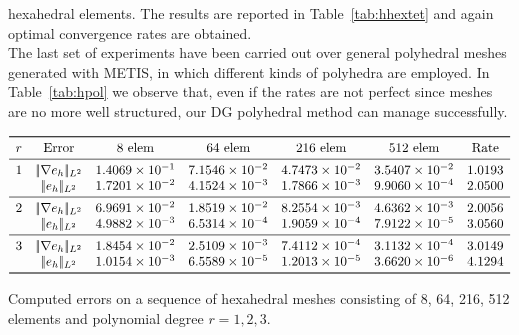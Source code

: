 \documentclass[12pt, a4paper]{article}
\theoremstyle{definition}
\theoremstyle{plain}
\theoremstyle{plain}
\theoremstyle{definition}
\begin{document}
hexahedral elements. The results are reported in Table~\ref{tab:hhextet} and 
again optimal convergence rates are obtained.\\
The last set of experiments have been carried out over general polyhedral 
meshes generated with METIS, in which different kinds of polyhedra are 
employed. In Table~\ref{tab:hpol} we observe that, even if the rates are not 
perfect since meshes are no more well structured, our DG polyhedral method can 
manage successfully.
\begin{table}[h]\footnotesize
	\centering
	\[
	\begin{array}{ccccccc}
	\toprule
	r & \text{Error} & \text{8 elem} & \text{64 elem} & \text{216 elem} & \text{512 elem} & \text{Rate} \\ 
	\midrule
	1 & |\!|\nabla e_{h}|\!|_{L^2} & 1.4069 \times 10^{-1} & 7.1546 \times 10^{-2} & 4.7473 \times 10^{-2} & 3.5407 \times 10^{-2} & 1.0193\\
	& |\!|e_{h}|\!|_{L^2} & 1.7201 \times 10^{-2} & 4.1524 \times 10^{-3} & 1.7866 \times 10^{-3} & 9.9060 \times 10^{-4} & 2.0500\\
	\midrule
	2 & |\!|\nabla e_{h}|\!|_{L^2} & 6.9691 \times 10^{-2} & 1.8519 \times 10^{-2} & 8.2554 \times 10^{-3} & 4.6362 \times 10^{-3} & 2.0056\\
	& |\!|e_{h}|\!|_{L^2} & 4.9882 \times 10^{-3} & 6.5314 \times 10^{-4} & 1.9059 \times 10^{-4} & 7.9122 \times 10^{-5} & 3.0560\\
	\midrule
	3 & |\!|\nabla e_{h}|\!|_{L^2} & 1.8454 \times 10^{-2} & 2.5109 \times 10^{-3} & 7.4112 \times 10^{-4} & 3.1132 \times 10^{-4} & 3.0149\\
	& |\!|e_{h}|\!|_{L^2} & 1.0154 \times 10^{-3} & 6.5589 \times 10^{-5} & 1.2013 \times 10^{-5} & 3.6620 \times 10^{-6} & 4.1294\\
	\bottomrule
	\end{array}
	\]
	\caption{Computed errors on a sequence of hexahedral meshes consisting of 
		8, 64, 216, 512 elements and polynomial degree $r=1,2,3$.} \label{tab:hhex}
\end{table}
\end{document}
